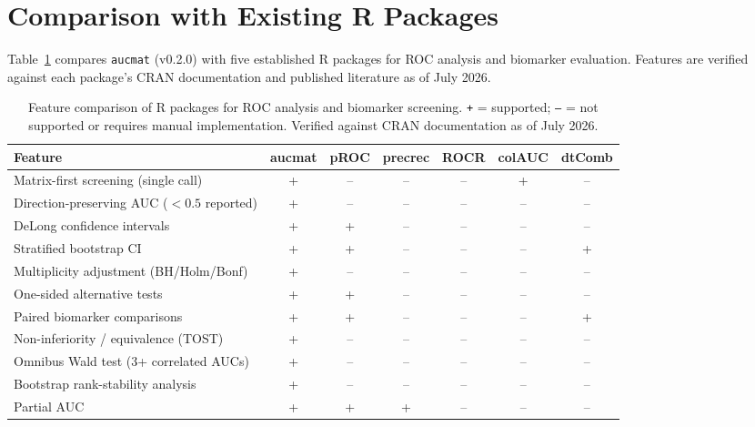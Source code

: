 \documentclass[11pt,a4paper]{article}
\begin{document}
\section{Comparison with Existing R Packages}

Table~\ref{tab:features} compares \texttt{aucmat} (v0.2.0) with five
established R packages for ROC analysis and biomarker evaluation.  Features
are verified against each package's CRAN documentation and published
literature as of July 2026.

\begin{table}[htbp]
\centering
\caption{Feature comparison of R packages for ROC analysis and biomarker
         screening.  \texttt{+} = supported; \texttt{--} = not supported or
         requires manual implementation.  Verified against CRAN
         documentation as of July 2026.}\label{tab:features}
\footnotesize
\begin{tabular}{@{}p{6.5cm}cccccc@{}}
\toprule
Feature & \textbf{aucmat} & pROC & precrec & ROCR & colAUC & dtComb \\
\midrule
Matrix-first screening (single call)                & + & -- & -- & -- & + & -- \\
Direction-preserving AUC ($<0.5$ reported)          & + & -- & -- & -- & -- & -- \\
DeLong confidence intervals                         & + & +  & -- & -- & -- & -- \\
Stratified bootstrap CI                             & + & +  & -- & -- & -- & + \\
Multiplicity adjustment (BH/Holm/Bonf)              & + & -- & -- & -- & -- & -- \\
One-sided alternative tests                         & + & +  & -- & -- & -- & -- \\
Paired biomarker comparisons                        & + & +  & -- & -- & -- & + \\
Non-inferiority / equivalence (TOST)                & + & -- & -- & -- & -- & -- \\
Omnibus Wald test (3+ correlated AUCs)              & + & -- & -- & -- & -- & -- \\
Bootstrap rank-stability analysis                   & + & -- & -- & -- & -- & -- \\
Partial AUC                                         & + & +  & +  & -- & -- & -- \\

\end{tabular}
\end{table}
\end{document}

